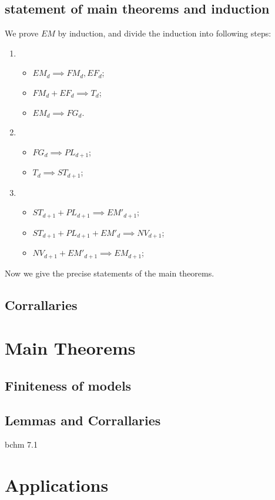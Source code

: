 \documentclass{article}
\begin{document}
\subsection{statement of main theorems and induction}
We prove $EM$ by induction, and divide the induction into following steps:
\begin{enumerate}
  \item 
  \begin{itemize}
    \item $EM_{d} \implies FM_{d},EF_{d}$;
    \item $FM_{d} + EF_{d} \implies T_{d}$;
    \item $EM_{d} \implies FG_{d}$.
  \end{itemize}
  \item 
    \begin{itemize}
      \item $FG_{d} \implies PL_{d+1}$;
      \item $T_{d}\implies ST_{d+1}$;
    \end{itemize}
  \item 
    \begin{itemize}
      \item $ST_{d+1}+PL_{d+1} \implies EM'_{d+1} $;
      \item $ST_{d+1}+PL_{d+1} + EM'_{d} \implies NV_{d+1}$;
      \item $NV_{d+1}+EM'_{d+1} \implies EM_{d+1} $;
    \end{itemize}
\end{enumerate}
Now we give the precise statements of the main theorems.
\subsection{Corrallaries}

\section{Main Theorems}
\subsection{Finiteness of models}
\subsection{Lemmas and Corrallaries}
bchm 7.1
\section{Applications}
\end{document}
